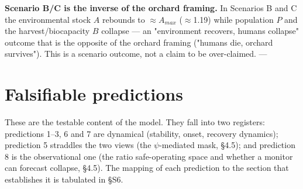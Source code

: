 \documentclass[11pt]{article}
\begin{document}
\textbf{Scenario B/C is the inverse of the orchard framing.} In Scenarios B and C the environmental stock $A$ rebounds to \ensuremath{\approx{}}$A_{max}$ (\ensuremath{\approx{}}1.19) while population $P$ and the harvest/biocapacity $B$ collapse — an "environment recovers, humans collapse" outcome that is the opposite of the orchard framing ("humans die, orchard survives"). This is a scenario outcome, not a claim to be over-claimed. ---

\section{Falsifiable predictions}

These are the testable content of the model. They fall into two registers: predictions 1–3, 6 and 7 are dynamical (stability, onset, recovery dynamics); prediction 5 straddles the two views (the \ensuremath{\psi{}}-mediated mask, §4.5); and prediction 8 is the observational one (the ratio safe-operating space and whether a monitor can forecast collapse, §4.5). The mapping of each prediction to the section that establishes it is tabulated in §S6.
\end{document}
